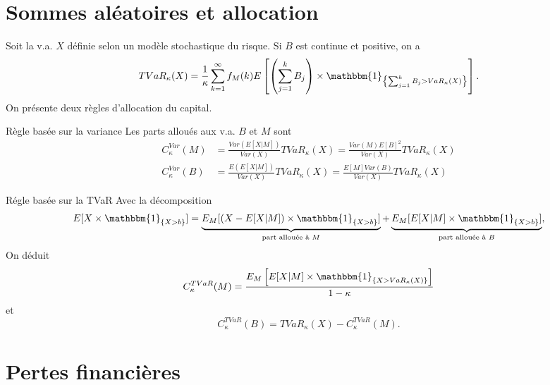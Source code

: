 \section{Sommes aléatoires et allocation}

Soit la v.a. $X$ définie selon un modèle stochastique du risque. Si $B$ est continue et positive, on a 
$$TVaR_\kappa(X) = \frac{1}{\kappa}\sum_{k = 1}^{\infty} f_M(k) E\left[ \left(\sum_{j = 1}^{k}B_j\right)\times \mathbbm{1}_{\left\{\sum_{j = 1}^{k}B_j > VaR_\kappa(X)\right\}}\right].$$
On présente deux règles d'allocation du capital. 

\begin{definition}{Règle basée sur la variance}{}
	Les parts alloués aux v.a. $B$ et $M$ sont
	\begin{align*}
	C_\kappa^{Var}(M) &= \frac{Var(E[X\vert M])}{Var(X)} TVaR_\kappa(X) = \frac{Var(M)E[B]^2}{Var(X)} TVaR_\kappa(X)\\
	C_\kappa^{Var}(B) &= \frac{E(E[X\vert M])}{Var(X)} TVaR_\kappa(X) = \frac{E[M]Var(B)}{Var(X)} TVaR_\kappa(X)
	\end{align*}
\end{definition}

\begin{definition}{Régle basée sur la TVaR}{}
	Avec la décomposition 
	$$E[X \times \mathbbm{1}_{\{X>b\}}] = \underbrace{E_M[(X - E[X\vert M])\times \mathbbm{1}_{\{X>b\}}]}_{\text{part allouée à }M} + \underbrace{E_M[E[X\vert M]\times \mathbbm{1}_{\{X>b\}}]}_{\text{part allouée à }B},$$
	On déduit
	$$C_\kappa^{TVaR}(M) = \frac{E_M\left[E[X \vert M] \times \mathbbm{1}_{\{X>VaR_\kappa(X)\}}\right]}{1 - \kappa}$$
	et
	$$C_\kappa^{TVaR}(B) = TVaR_\kappa(X) - C_\kappa^{TVaR}(M).$$
\end{definition}

\section{Pertes financières}

